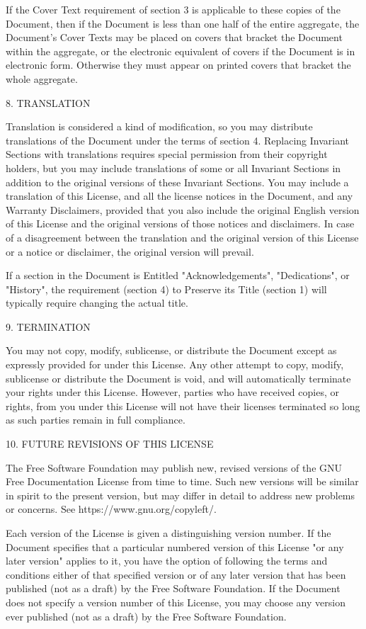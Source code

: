 \documentclass[a4paper,11pt]{report}
\begin{document}
{ If the Cover Text requirement of section 3 is applicable to these copies of
the Document, then if the Document is less than one half of the entire
aggregate, the Document's Cover Texts may be placed on covers that bracket the
Document within the aggregate, or the electronic equivalent of covers if the
Document is in electronic form. Otherwise they must appear on printed covers
that bracket the whole aggregate. 

 8. TRANSLATION 

 Translation is considered a kind of modification, so you may distribute
translations of the Document under the terms of section 4. Replacing Invariant
Sections with translations requires special permission from their copyright
holders, but you may include translations of some or all Invariant Sections in
addition to the original versions of these Invariant Sections. You may include
a translation of this License, and all the license notices in the Document,
and any Warranty Disclaimers, provided that you also include the original
English version of this License and the original versions of those notices and
disclaimers. In case of a disagreement between the translation and the
original version of this License or a notice or disclaimer, the original
version will prevail. 

 If a section in the Document is Entitled "Acknowledgements", "Dedications", or
"History", the requirement (section 4) to Preserve its Title (section 1) will
typically require changing the actual title. 

 9. TERMINATION 

 You may not copy, modify, sublicense, or distribute the Document except as
expressly provided for under this License. Any other attempt to copy, modify,
sublicense or distribute the Document is void, and will automatically
terminate your rights under this License. However, parties who have received
copies, or rights, from you under this License will not have their licenses
terminated so long as such parties remain in full compliance. 

 10. FUTURE REVISIONS OF THIS LICENSE 

 The Free Software Foundation may publish new, revised versions of the GNU Free
Documentation License from time to time. Such new versions will be similar in
spirit to the present version, but may differ in detail to address new
problems or concerns. See https://www.gnu.org/copyleft/. 

 Each version of the License is given a distinguishing version number. If the
Document specifies that a particular numbered version of this License "or any
later version" applies to it, you have the option of following the terms and
conditions either of that specified version or of any later version that has
been published (not as a draft) by the Free Software Foundation. If the
Document does not specify a version number of this License, you may choose any
version ever published (not as a draft) by the Free Software Foundation. }
\end{document}
